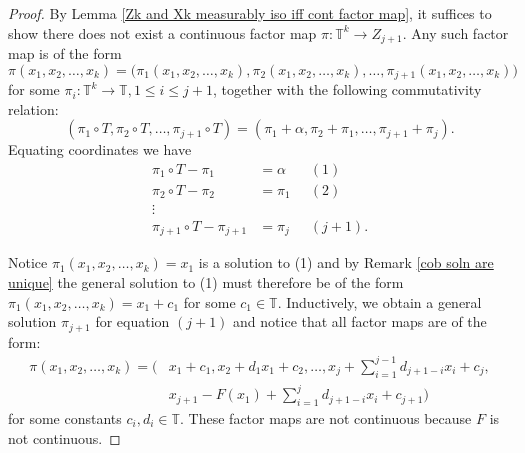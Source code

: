 \documentclass[12pt]{amsart}
\theoremstyle{definition}
\theoremstyle{plain}
\theoremstyle{definition}
\numberwithin{equation}{section}
\begin{document}
\begin{proof}
By Lemma \ref{Zk and Xk measurably iso iff cont factor map}, it suffices to show there does not exist a continuous factor map $\pi\colon \mathbb{T}^{k} \rightarrow Z_{j+1}$. Any such factor map is of the form $$\pi(x_1,x_2,\dots,x_{k})=\Big(\pi_1(x_1,x_2,\dots,x_{k}),\pi_2(x_1,x_2,\dots,x_{k}),\dots,\pi_{j+1}(x_1,x_2,\dots,x_{k})\Big)$$ for some $\pi_i\colon \mathbb{T}^{k}\rightarrow \mathbb{T}, 1\leq i \leq j+1$, together with the following commutativity relation: $$(\pi_1\circ T, \pi_2 \circ T,\dots,\pi_{j+1} \circ T)=(\pi_1+\alpha,\pi_2+\pi_1,\dots,\pi_{j+1}+\pi_{j}).$$ Equating coordinates we have 
\begin{align*}
    \pi_1\circ T - \pi_1&= \alpha \;\; &(1) \\
    \pi_2\circ T-\pi_2&=\pi_1\;\; &(2) \\
  \vdots \\
    \pi_{j+1} \circ T-\pi_{j+1}&=\pi_{j}  &(j+1).
\end{align*}

\noindent Notice $\pi_1(x_1,x_2,\dots,x_{k})=x_1$ is a solution to (1) and by Remark \ref{cob soln are unique} the general solution to (1) must therefore be of the form $\pi_1(x_1,x_2,\dots,x_{k})=x_1+c_1$ for some $c_1 \in \mathbb{T}$. %
Inductively, we obtain a general solution $\pi_{j+1}$ for equation $(j+1)$ and notice that all factor maps are of the form: 
\begin{align*}
\pi(x_1,x_2,\dots,x_{k})=\Big(&x_1+c_1,x_2+d_1x_1+c_2,\dots, x_j+\sum_{i=1}^{j-1} d_{j+1-i}x_i+c_j,\\ &x_{j+1}-F(x_1)+\sum_{i=1}^{j}d_{j+1-i}x_{i} + c_{j+1}\Big)
\end{align*}
for some constants $c_i,d_i \in \mathbb{T}$. These factor maps are not continuous because $F$ is not continuous. \end{proof}
\end{document}
